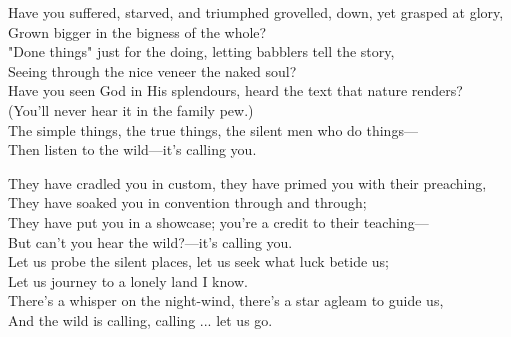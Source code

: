 \begin{poemblock}
Have you suffered, starved, and triumphed grovelled, down, yet grasped at glory,\\
\idt Grown bigger in the bigness of the whole?\\
"Done things" just for the doing, letting babblers tell the story,\\
\idt Seeing through the nice veneer the naked soul?\\
Have you seen God in His splendours, heard the text that nature renders?\\
\idt (You'll never hear it in the family pew.)\\
The simple things, the true things, the silent men who do things—\\
\idt Then listen to the wild—it's calling you.

They have cradled you in custom, they have primed you with their preaching,\\
\idt They have soaked you in convention through and through;\\
They have put you in a showcase; you're a credit to their teaching—\\
\idt But can't you hear the wild?—it's calling you.\\
Let us probe the silent places, let us seek what luck betide us;\\
\idt Let us journey to a lonely land I know.\\
There's a whisper on the night-wind, there's a star agleam to guide us,\\
\idt And the wild is calling, calling ... let us go.

\end{poemblock}
